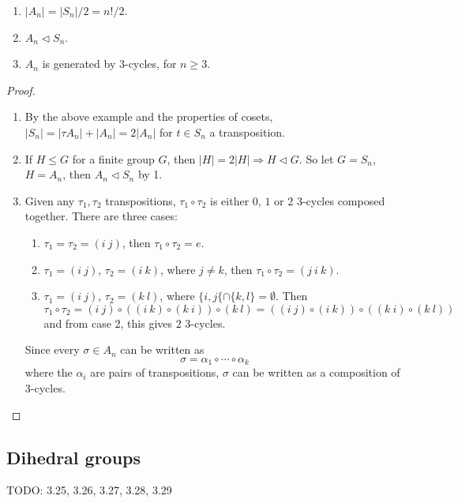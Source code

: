 \begin{proposition}
	\hfill
	\begin{enumerate}
		\item $|A_n| = |S_n| / 2 = n! / 2$.
		\item $A_n \triangleleft S_n$.
		\item $A_n$ is generated by $3$-cycles, for $n \ge 3$.
	\end{enumerate}
\end{proposition}

\begin{proof}
	\hfill
	\begin{enumerate}
		\item By the above example and the properties of cosets, $|S_n| = |\tau A_n| + |A_n| = 2 |A_n|$ for $t \in S_n$ a transposition.
		\item If $H \le G$ for a finite group $G$, then $|H| = 2 |H| \Longrightarrow H \triangleleft G$. So let $G = S_n$, $H = A_n$, then $A_n \triangleleft S_n$ by 1.
		\item Given any $\tau_1, \tau_2$ transpositions, $\tau_1 \circ \tau_2$ is either $0$, $1$ or $2$ $3$-cycles composed together. There are three cases:
		\begin{enumerate}
			\item $\tau_1 = \tau_2 = (i \ j)$, then $\tau_1 \circ \tau_2 = e$.
			\item $\tau_1 = (i \ j)$, $\tau_2 = (i \ k)$, where $j \ne k$, then $\tau_1 \circ \tau_2 = (j \ i \ k)$.
			\item $\tau_1 = (i \ j)$, $\tau_2 = (k \ l)$, where $\{ i, j \{ \cap \{ k, l \} = \emptyset$. Then
			\[
				\tau_1 \circ \tau_2 = (i \ j) \circ ((i \ k) \circ (k \ i)) \circ (k \ l) = ((i \ j) \circ (i \ k)) \circ ((k \ i) \circ (k \ l))
			\]
			and from case 2, this gives $2$ $3$-cycles.
		\end{enumerate}
		Since every $\sigma \in A_n$ can be written as
		\[
			\sigma = \alpha_1 \circ \cdots \circ \alpha_k
		\]
		where the $\alpha_i$ are pairs of transpositions, $\sigma$ can be written as a composition of $3$-cycles.
	\end{enumerate}
\end{proof}

\subsection{Dihedral groups}

TODO: 3.25, 3.26, 3.27, 3.28, 3.29

